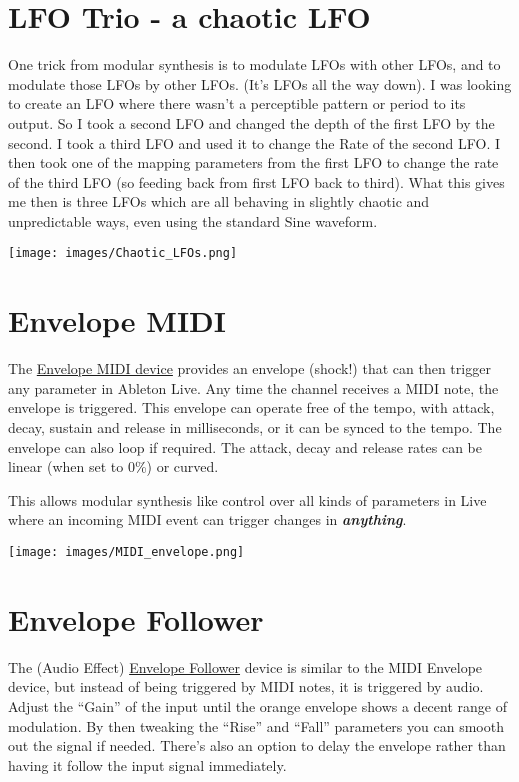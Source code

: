 \documentclass[
  12pt,
  letterpaper,
  oneside,
  open=any]{scrbook}
\begin{document}
\section{LFO Trio - a chaotic LFO}\label{lfo-trio---a-chaotic-lfo}

One trick from modular synthesis is to modulate LFOs with other LFOs,
and to modulate those LFOs by other LFOs. (It's LFOs all the way down).
I was looking to create an LFO where there wasn't a perceptible pattern
or period to its output. So I took a second LFO and changed the depth of
the first LFO by the second. I took a third LFO and used it to change
the Rate of the second LFO. I then took one of the mapping parameters
from the first LFO to change the rate of the third LFO (so feeding back
from first LFO back to third). What this gives me then is three LFOs
which are all behaving in slightly chaotic and unpredictable ways, even
using the standard Sine waveform.

\texttt{[image: images/Chaotic\_LFOs.png]}

\section{Envelope MIDI}\label{envelope-midi}

The
\href{https://www.ableton.com/en/live-manual/11/max-for-live-devices/\#envelope-midi}{Envelope
MIDI device} provides an envelope (shock!) that can then trigger any
parameter in Ableton Live. Any time the channel receives a MIDI note,
the envelope is triggered. This envelope can operate free of the tempo,
with attack, decay, sustain and release in milliseconds, or it can be
synced to the tempo. The envelope can also loop if required. The attack,
decay and release rates can be linear (when set to 0\%) or curved.

This allows modular synthesis like control over all kinds of parameters
in Live where an incoming MIDI event can trigger changes in
\textbf{\emph{anything}}.

\texttt{[image: images/MIDI\_envelope.png]}

\section{Envelope Follower}\label{envelope-follower}

The (Audio Effect)
\href{https://www.ableton.com/en/live-manual/11/max-for-live-devices/\#envelope-follower}{Envelope
Follower} device is similar to the MIDI Envelope device, but instead of
being triggered by MIDI notes, it is triggered by audio. Adjust the
``Gain'' of the input until the orange envelope shows a decent range of
modulation. By then tweaking the ``Rise'' and ``Fall'' parameters you
can smooth out the signal if needed. There's also an option to delay the
envelope rather than having it follow the input signal immediately.
\end{document}
